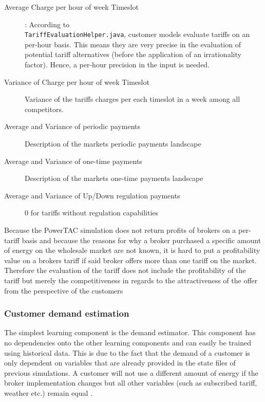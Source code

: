 \begin{description}
    \item[Average Charge per hour of week Timeslot]: According to \\ \texttt{TariffEvaluationHelper.java}, customer
        models evaluate tariffs on an per-hour basis. This means they are very precise in the evaluation of potential
        tariff alternatives (before the application of an irrationality factor). Hence, a per-hour precision in the
        input is needed.
    \item[Variance of Charge per hour of week Timeslot] Variance of the tariffs charges per each timeslot in a week
        among all competitors.
    \item[Average and Variance of periodic payments] Description of the markets periodic payments landscape
    \item[Average and Variance of one-time payments] Description of the markets one-time payments landscape
    \item[Average and Variance of Up/Down regulation payments] 0 for tariffs without regulation capabilities
\end{description}

Because the \ac {PowerTAC} simulation does not return profits of brokers on a per-tariff basis and because the reasons
for why a broker purchased a specific amount of energy on the wholesale market are not known, it is hard to put a
profitability value on a brokers tariff if said broker offers more than one tariff on the market. Therefore the
evaluation of the tariff does not include the profitability of the tariff but merely the competitiveness in regards to
the attractiveness of the offer from the perspective of the customers
%
%
\subsubsection{Customer demand estimation}%
\label{ssub:customer_demand_estimation}

The simplest learning component is the demand estimator. This component has no dependencies onto the other learning components and can easily be trained using historical data. This is due to the fact that the demand of a customer is only dependent on variables that are already provided in the state files of previous simulations. A customer will not use a different amount of energy if the broker implementation changes but all other variables (such as subscribed tariff, weather etc.) remain equal .

